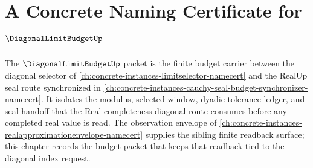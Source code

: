 \chapter{A Concrete Naming Certificate for $\DiagonalLimitBudgetUp$}
\label{ch:concrete-instances-diagonal-limit-budget-namecert}

The $\DiagonalLimitBudgetUp$ packet is the finite budget carrier between the diagonal selector of \autoref{ch:concrete-instances-limitselector-namecert} and the RealUp seal route synchronized in \autoref{ch:concrete-instances-cauchy-seal-budget-synchronizer-namecert}. It isolates the modulus, selected window, dyadic-tolerance ledger, and seal handoff that the Real completeness diagonal route consumes before any completed real value is read. The observation envelope of \autoref{ch:concrete-instances-realapproximationenvelope-namecert} supplies the sibling finite readback surface; this chapter records the budget packet that keeps that readback tied to the diagonal index request.



